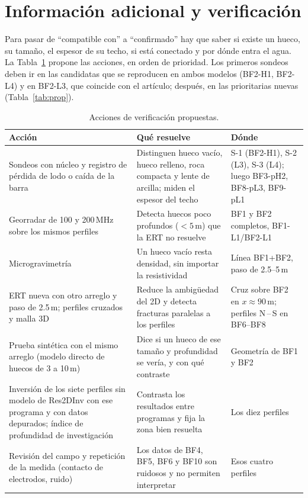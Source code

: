 \documentclass[conference]{IEEEtran}
\begin{document}
\section{Informaci\'on adicional y verificaci\'on}
Para pasar de ``compatible con'' a ``confirmado'' hay que saber si existe un hueco, su tama\~no, el espesor de su techo, si est\'a conectado y por d\'onde entra el agua. La Tabla~\ref{tab:verif} propone las acciones, en orden de prioridad. Los primeros sondeos deben ir en las candidatas que se reproducen en ambos modelos (BF2-H1, BF2-L4) y en BF2-L3, que coincide con el art\'iculo; despu\'es, en las prioritarias nuevas (Tabla~\ref{tab:prop}).

\begin{table}[!t]
\caption{Acciones de verificaci\'on propuestas.}
\label{tab:verif}
\centering\footnotesize
\renewcommand{\arraystretch}{1.1}
\begin{tabular}{p{}p{}p{}}
\toprule
Acci\'on & Qu\'e resuelve & D\'onde \\
\midrule
Sondeos con n\'ucleo y registro de p\'erdida de lodo o ca\'ida de la barra & Distinguen hueco vac\'io, hueco relleno, roca compacta y lente de arcilla; miden el espesor del techo & S-1 (BF2-H1), S-2 (L3), S-3 (L4); luego BF3-pH2, BF8-pL3, BF9-pL1 \\
Georradar de 100 y 200\,MHz sobre los mismos perfiles & Detecta huecos poco profundos ($<5$\,m) que la ERT no resuelve & BF1 y BF2 completos, BF1-L1/BF2-L1 \\
Microgravimetr\'ia & Un hueco vac\'io resta densidad, sin importar la resistividad & L\'inea BF1+BF2, paso de 2.5--5\,m \\
ERT nueva con otro arreglo y paso de 2.5\,m; perfiles cruzados y malla 3D & Reduce la ambig\"uedad del 2D y detecta fracturas paralelas a los perfiles & Cruz sobre BF2 en $x\approx 90$\,m; perfiles N\,--\,S en BF6--BF8 \\
Prueba sint\'etica con el mismo arreglo (modelo directo de huecos de 3 a 10\,m) & Dice si un hueco de ese tama\~no y profundidad se ver\'ia, y con qu\'e contraste & Geometr\'ia de BF1 y BF2 \\
Inversi\'on de los siete perfiles sin modelo de Res2DInv con ese programa y con datos depurados; \'indice de profundidad de investigaci\'on \cite{oldenburg1999} & Contrasta los resultados entre programas y fija la zona bien resuelta & Los diez perfiles \\
Revisi\'on del campo y repetici\'on de la medida (contacto de electrodos, ruido) & Los datos de BF4, BF5, BF6 y BF10 son ruidosos y no permiten interpretar & Esos cuatro perfiles \\

\end{tabular}
\end{table}
\end{document}
